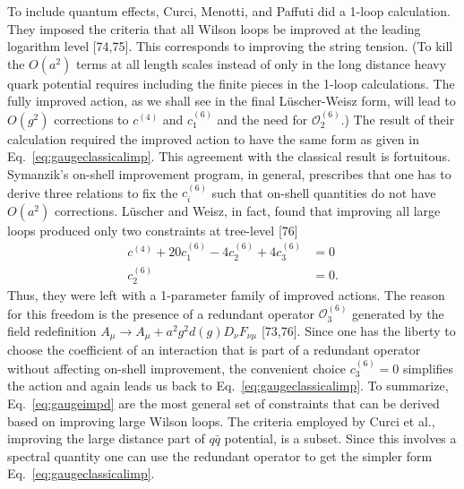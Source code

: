 To include quantum effects, Curci, Menotti, and Paffuti did a 1-loop
calculation.  They imposed the criteria that all Wilson loops be
improved at the leading logarithm level [74,75].  This corresponds to
improving the string tension.  (To kill the $O(a^2)$ terms at all
length scales instead of only in the long distance heavy quark
potential requires including the finite pieces in the 1-loop
calculations.  The fully improved action, as we shall see in the final
L\"uscher-Weisz form, will lead to $O(g^2)$ corrections to $c^{(4)}$
and $c_1^{(6)}$ and the need for $\mathcal{O}_2^{(6)}$.)  The result of
their calculation required the improved action to have the same form as
given in Eq.~\ref{eq:gaugeclassicalimp}.  This agreement with the
classical result is fortuitous.  Symanzik's on-shell improvement
program, in general, prescribes that one has to derive three relations
to fix the $c_i^{(6)}$ such that on-shell quantities do not have
$O(a^2)$ corrections.  L\"uscher and Weisz, in fact, found that
improving all large loops produced only two constraints at tree-level
[76]
\begin{equation}
\begin{aligned}
c^{(4)} + 20c_1^{(6)} - 4c_2^{(6)} + 4c_3^{(6)} &= 0\\
c_2^{(6)} &= 0.
\end{aligned}
\label{eq:gaugeimpd}
\end{equation}
Thus, they were left with a 1-parameter family of improved actions.
The reason for this freedom is the presence of a redundant operator
$\mathcal{O}_3^{(6)}$ generated by the field redefinition
$A_\mu \to A_\mu + a^2g^2d(g)D_\nu F_{\nu\mu}$ [73,76].  Since one has
the liberty to choose the coefficient of an interaction that is part of
a redundant operator without affecting on-shell improvement, the
convenient choice $c_3^{(6)} = 0$ simplifies the action and again leads
us back to Eq.~\ref{eq:gaugeclassicalimp}.  To summarize,
Eq.~\ref{eq:gaugeimpd} are the most general set of constraints that can
be derived based on improving large Wilson loops.  The criteria
employed by Curci et al., improving the large distance part of $q\bar q$
potential, is a subset.  Since this involves a spectral quantity one
can use the redundant operator to get the simpler form
Eq.~\ref{eq:gaugeclassicalimp}.

